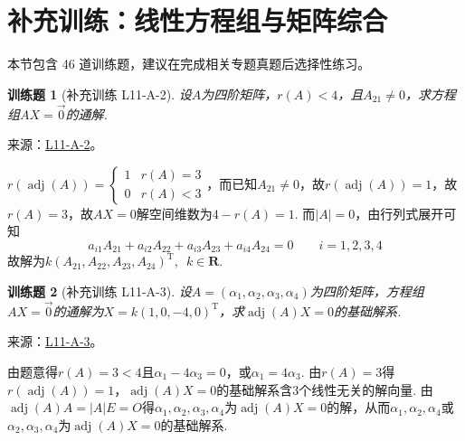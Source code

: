 \documentclass[12pt,fontset=fandol]{ctexart}
\newtheorem{exercise}{训练题}[section]
\begin{document}
\section{补充训练：线性方程组与矩阵综合}

本节包含 46 道训练题，建议在完成相关专题真题后选择性练习。

\begin{exercise}[补充训练 L11-A-2]\label{prob:L11-A-2}
设$A$为四阶矩阵，$r(A)<4$，且$A_{21}\neq 0$，求方程组$AX=\vec{0}$的通解.
\end{exercise}
\noindent 来源：\href{https://github.com/yhwu-is/Linear-Algebra-Left-Undone/blob/new/%E8%AE%B2%E4%B9%89/%E4%B8%93%E9%A2%98/11%20%E6%9C%9D%E8%8A%B1%E5%A4%95%E6%8B%BE.tex}{L11-A-2}。
\begin{solve}
$r(\operatorname{adj}(A))=
              \begin{cases}
                  1 & r(A)=3 \\
                  0 & r(A)<3
              \end{cases}$，而已知$A_{21}\neq 0$，故$r(\operatorname{adj}(A))=1$，故$r(A)=3$，故$AX = 0$解空间维数为$4-r(A)=1$. 而$|A|=0$，由行列式展开可知
          \[ a_{i1}A_{21}+a_{i2}A_{22}+a_{i3}A_{23}+a_{i4}A_{24}=0 \qquad i=1,2,3,4 \]
          故解为$k(A_{21},A_{22},A_{23},A_{24})^\mathrm{T},\enspace k\in \mathbf{R}$.
\end{solve}

\begin{exercise}[补充训练 L11-A-3]\label{prob:L11-A-3}
设$A=(\alpha_1,\alpha_2,\alpha_3,\alpha_4)$为四阶矩阵，方程组$AX=\vec{0}$的通解为$X=k(1,0,-4,0)^\mathrm{T}$，求$\operatorname{adj}(A)X=0$的基础解系.
\end{exercise}
\noindent 来源：\href{https://github.com/yhwu-is/Linear-Algebra-Left-Undone/blob/new/%E8%AE%B2%E4%B9%89/%E4%B8%93%E9%A2%98/11%20%E6%9C%9D%E8%8A%B1%E5%A4%95%E6%8B%BE.tex}{L11-A-3}。
\begin{solve}
由题意得$r(A)=3<4$且$\alpha_1-4\alpha_3=0$，或$\alpha_1=4\alpha_3$. 由$r(A)=3$得$r(\operatorname{adj}(A))=1$，$\operatorname{adj}(A)X=0$的基础解系含3个线性无关的解向量. 由$\operatorname{adj}(A)A=|A|E=O$得$\alpha_1,\alpha_2,\alpha_3,\alpha_4$为$\operatorname{adj}(A)X=0$的解，从而$\alpha_1,\alpha_2,\alpha_4$或$\alpha_2,\alpha_3,\alpha_4$为$\operatorname{adj}(A)X=0$的基础解系.
\end{solve}
\end{document}
